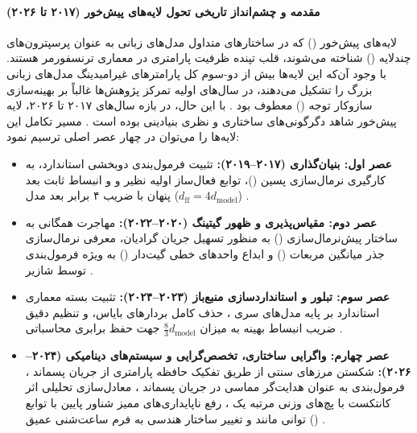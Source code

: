 \item {}

\paragraph*{مقدمه و چشم‌انداز تاریخی تحول لایه‌های پیش‌خور (۲۰۱۷ تا ۲۰۲۶)}
لایه‌های پیش‌خور () که در ساختارهای متداول مدل‌های زبانی به عنوان پرسپترون‌های چندلایه () شناخته می‌شوند، قلب تپنده ظرفیت پارامتری در معماری ترنسفورمر \cite{vaswani2017attention} هستند. با وجود آن‌که این لایه‌ها بیش از دو-سوم کل پارامترهای غیرامبدینگ مدل‌های زبانی بزرگ را تشکیل می‌دهند، در سال‌های اولیه تمرکز پژوهش‌ها غالباً بر بهینه‌سازی سازوکار توجه () معطوف بود \cite{gerber2025attention}. با این حال، در بازه سال‌های ۲۰۱۷ تا ۲۰۲۶، لایه پیش‌خور شاهد دگرگونی‌های ساختاری و نظری بنیادینی بوده است \cite{sajun2024historical, tan2025crystallization}. مسیر تکامل این لایه‌ها را می‌توان در چهار عصر اصلی ترسیم نمود:
\begin{itemize}
    \item \textbf{عصر اول: بنیان‌گذاری (۲۰۱۷--۲۰۱۹):} تثبیت فرمول‌بندی دوبخشی استاندارد، به کارگیری نرمال‌سازی پسین ()، توابع فعال‌ساز اولیه نظیر  و  و انبساط ثابت بعد پنهان با ضریب ۴ برابر بعد مدل ($d_{\text{ff}} = 4d_{\text{model}}$) \cite{vaswani2017attention, sajun2024historical}.
    \item \textbf{عصر دوم: مقیاس‌پذیری و ظهور گیتینگ (۲۰۲۰--۲۰۲۲):} مهاجرت همگانی به ساختار پیش‌نرمال‌سازی () به منظور تسهیل جریان گرادیان، معرفی نرمال‌سازی جذر میانگین مربعات () و ابداع واحدهای خطی گیت‌دار () به ویژه فرمول‌بندی  توسط شازیر \cite{shazeer2020glu}.
    \item \textbf{عصر سوم: تبلور و استانداردسازی منبع‌باز (۲۰۲۳--۲۰۲۴):} تثبیت بسته معماری استاندارد بر پایه مدل‌های سری ، حذف کامل بردارهای بایاس، و تنظیم دقیق ضریب انبساط بهینه به میزان $\frac{8}{3}d_{\text{model}}$ جهت حفظ برابری محاسباتی \cite{tan2025crystallization}.
    \item \textbf{عصر چهارم: واگرایی ساختاری، تخصص‌گرایی و سیستم‌های دینامیکی (۲۰۲۴--۲۰۲۶):} شکستن مرزهای سنتی از طریق تفکیک حافظه پارامتری از جریان پسماند \cite{jaiswal2026memoryllm}، فرمول‌بندی به عنوان هدایت‌گر مماسی در جریان پسماند \cite{mudarisov2026feedforward}، معادل‌سازی تحلیلی اثر کانتکست با پچ‌های وزنی مرتبه یک \cite{goldwaser2026equivalence}، رفع ناپایداری‌های ممیز شناور پایین با توابع توانی مانند  \cite{jiang2026powlu} و تغییر ساختار هندسی به فرم ساعت‌شنی عمیق () \cite{liao2026revisiting}.
\end{itemize}

